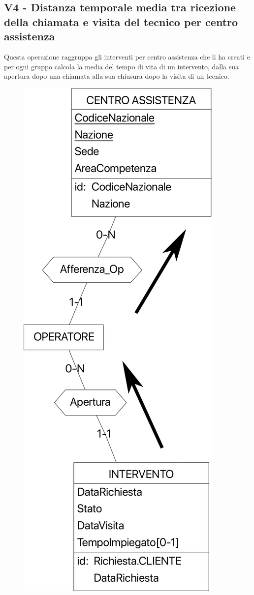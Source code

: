 \documentclass[a4paper, 12pt]{report}
\begin{document}
\subsection{V4 -  Distanza temporale media tra ricezione della chiamata e visita del tecnico per centro assistenza}

Questa operazione raggruppa gli interventi per centro assistenza che li ha creati e per ogni gruppo calcola la media del tempo di vita di un intervento, dalla sua apertura
dopo una chiamata alla sua chiusura dopo la visita di un tecnico.

\begin{figure}[H]
	\centering
	\includegraphics[width=\linewidth]{images/V4.png}

\end{figure}
\end{document}
